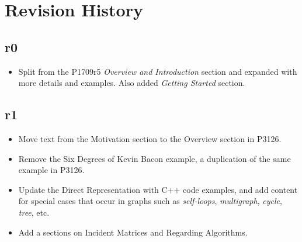 \section{Revision History}

\subsection*{\paperno r0}

\begin{itemize}
      \item Split from the P1709r5 \textit{Overview and Introduction} section and expanded with 
            more details and examples. Also added \textit{Getting Started} section.
\end{itemize}

\subsection*{\paperno r1}

\begin{itemize}
      \item Move text from the Motivation section to the Overview section in P3126.
      \item Remove the Six Degrees of Kevin Bacon example, a duplication of the same example in P3126.
      \item Update the Direct Representation with C++ code examples, and add content for special cases that 
            occur in graphs such as \emph{self-loops}, \emph{multigraph}, \emph{cycle}, \emph{tree}, etc.
      \item Add a sections on Incident Matrices and Regarding Algorithms.
\end{itemize}
